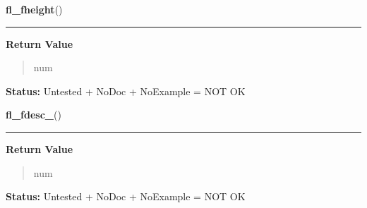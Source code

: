     \label{xformslib:library:fl_fheight_}

    \vspace{0.5ex}

\hspace{.8\funcindent}\begin{boxedminipage}{\funcwidth}

    \raggedright \textbf{fl\_fheight}()

    \vspace{-1.5ex}

    \rule{\textwidth}{0.5\fboxrule}
\setlength{\parskip}{2ex}
\setlength{\parskip}{1ex}
      \textbf{Return Value}
    \vspace{-1ex}

      \begin{quote}
      num

      \end{quote}

\textbf{Status:} Untested + NoDoc + NoExample = NOT OK



    \end{boxedminipage}

    \label{xformslib:library:fl_fdesc_}

    \vspace{0.5ex}

\hspace{.8\funcindent}\begin{boxedminipage}{\funcwidth}

    \raggedright \textbf{fl\_fdesc\_}()

    \vspace{-1.5ex}

    \rule{\textwidth}{0.5\fboxrule}
\setlength{\parskip}{2ex}
\setlength{\parskip}{1ex}
      \textbf{Return Value}
    \vspace{-1ex}

      \begin{quote}
      num

      \end{quote}

\textbf{Status:} Untested + NoDoc + NoExample = NOT OK



    \end{boxedminipage}

